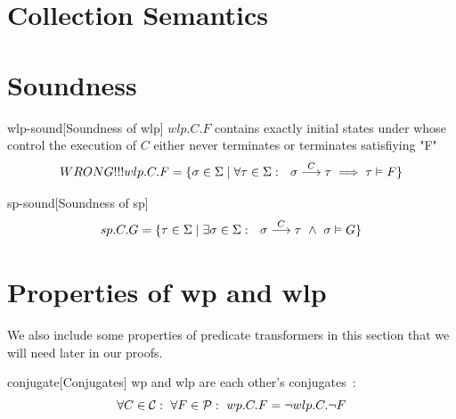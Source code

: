 \section{Collection Semantics}\label{sec:collection}


\section{Soundness}\label{sec:sound} 

\begin{theorem}{wlp-sound}[Soundness of wlp] $wlp.C.F$ contains exactly initial states under whose control the execution of $C$ either never terminates or terminates satisfiying "F"~{\normalfont\cite{dijkstra90}}
\ \vspace{-1.5mm} 
\[
WRONG!!! wlp.C.F = \{ \sigma\in\S \mid
\forall \tau\in\S:\ \ \sigma\goto{C}\tau\implies  \tau\vDash F
 \} %
\]
\end{theorem}

\begin{theorem}{sp-sound}[Soundness of sp]~{\normalfont\cite{vries11,zhang22}}
\ \vspace{-1.5mm}
\[
sp.C.G = \{ \tau\in{\Sigma} \mid \exists \sigma\in{\Sigma}:\ \ \sigma\stackrel{C}{\longrightarrow}\tau\ \wedge\ \sigma\vDash G\}
\]
\label{thm:sp}
\end{theorem}


\section{Properties of wp and wlp}\label{sec:prop}
We also include some properties of predicate transformers in this section that we will need later in our proofs. 
\begin{theorem}{conjugate}[Conjugates]
  wp and wlp are each other's conjugates~{\normalfont\cite{zhang22}}:
  \[\forall C\in\mathcal{C}:\ \forall F\in\mathcal{P}:\ wp.C.F = \neg wlp.C.\neg F\]
\end{theorem}

